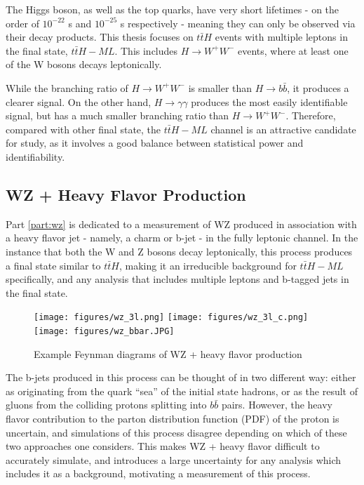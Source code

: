 The Higgs boson, as well as the top quarks, have very short lifetimes - on the order of $10^{-22}$ s and $10^{-25}$ s respectively - meaning they can only be observed via their decay products. This thesis focuses on $t\bar{t}H$ events with multiple leptons in the final state, $t\bar{t}H-ML$. This includes $H \rightarrow W^+W^-$ events, where at least one of the W bosons decays leptonically. 

While the branching ratio of $H\rightarrow W^+W^-$ is smaller than $H \rightarrow b \bar{b}$, it produces a clearer signal. On the other hand, $H\rightarrow \gamma\gamma$ produces the most easily identifiable signal, but has a much smaller branching ratio than $H\rightarrow W^+W^-$. Therefore, compared with other final state, the $t\bar{t}H-ML$ channel is an attractive candidate for study, as it involves a good balance between statistical power and identifiability. 


\subsection{WZ + Heavy Flavor Production}
\label{sec:WZ_theory}

Part \ref{part:wz} is dedicated to a measurement of WZ produced in association with a heavy flavor jet - namely, a charm or b-jet - in the fully leptonic channel. In the instance that both the W and Z bosons decay leptonically, this process produces a final state similar to $t\bar{t}H$, making it an irreducible background for $t\bar{t}H-ML$ specifically, and any analysis that includes multiple leptons and b-tagged jets in the final state. 

\begin{figure}[H]
  \texttt{[image: figures/wz\_3l.png]}%
  \texttt{[image: figures/wz\_3l\_c.png]}%
  \texttt{[image: figures/wz\_bbar.JPG]}
  \caption{Example Feynman diagrams of WZ + heavy flavor production}
  \label{fig:wz_feynman}
\end{figure}

The b-jets produced in this process can be thought of in two different way: either as originating from the quark ``sea'' of the initial state hadrons, or as the result of gluons from the colliding protons splitting into $b\bar{b}$ pairs. However, the heavy flavor contribution to the parton distribution function (PDF) of the proton is uncertain, and simulations of this process disagree depending on which of these two approaches one considers. This makes WZ + heavy flavor difficult to accurately simulate, and introduces a large uncertainty for any analysis which includes it as a background, motivating a measurement of this process.

